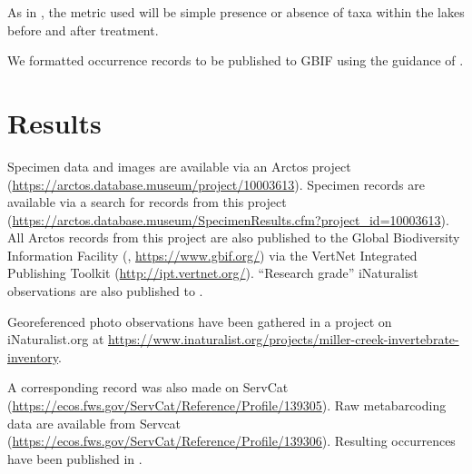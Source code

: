 \begin{multicols}{2}
As in \citet{Massengill2014, Massengill2017}, the metric used will be simple presence or absence of taxa within the lakes before and after treatment.

We formatted occurrence records to be published to GBIF using the guidance of \citet{Anderssonetal2020}.

\section{Results}

Specimen data and images are available via an Arctos project (\url{https://arctos.database.museum/project/10003613}). Specimen records are available via a search for records from this project (\url{https://arctos.database.museum/SpecimenResults.cfm?project_id=10003613}). All Arctos records from this project are also published to the Global Biodiversity Information Facility (, \url{https://www.gbif.org/}) via the VertNet Integrated Publishing Toolkit (\url{http://ipt.vertnet.org/}). ``Research grade'' iNaturalist observations are also published to .

Georeferenced photo observations have been gathered in a project on iNaturalist.org at \url{https://www.inaturalist.org/projects/miller-creek-invertebrate-inventory}.

A corresponding record was also made on ServCat (\url{https://ecos.fws.gov/ServCat/Reference/Profile/139305}). Raw metabarcoding data are available from Servcat (\url{https://ecos.fws.gov/ServCat/Reference/Profile/139306}). Resulting occurrences have been published in \citet{Bowseretal2022}.

\end{multicols}

